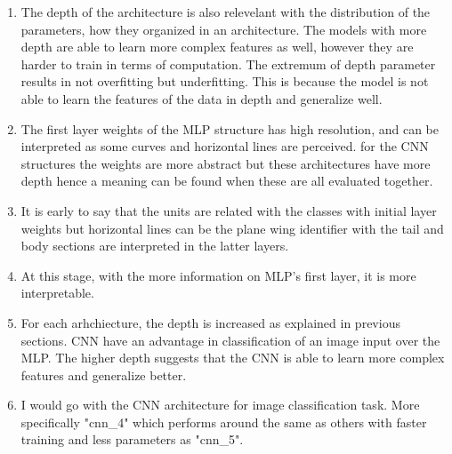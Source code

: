 \documentclass[3p,times,procedia]{elsarticle}
\makeatletter
\newcommand{\subf}[2]{%
  {\small\begin{tabular}[t]{@{}c@{}}
  #1\\#2
  \end{tabular}}%
}
\makeatother
\begin{document}
\begin{enumerate}
    \item The depth of the architecture is also relevelant with the distribution of the parameters, how they organized in an architecture. The models with more depth are able to learn more complex features as well, however they are harder to train in terms of computation.
    The extremum of depth parameter results in not overfitting but underfitting. This is because the model is not able to learn the features of the data in depth and generalize well.


    \item The first layer weights of the MLP structure has high resolution, and can be interpreted as some curves and horizontal lines are perceived.
    for the CNN structures the weights are more abstract but these architectures have more depth hence a meaning can be found when these are all evaluated together.
    \item It is early to say that the units are related with the classes with initial layer weights but horizontal lines can be the plane wing identifier with the tail and body sections are interpreted in the latter layers.
    \item At this stage, with the more information on MLP's first layer, it is more interpretable.
    \item For each arhchiecture, the depth is increased as explained in previous sections. CNN have an advantage in classification of an image input over the MLP. The higher depth suggests that the CNN is able to learn more complex features and generalize better.
    \item I would go with the CNN architecture for image classification task. More specifically "cnn\_4" which performs around the same as others with faster training and less parameters as "cnn\_5".
    
\end{enumerate}
\end{document}
